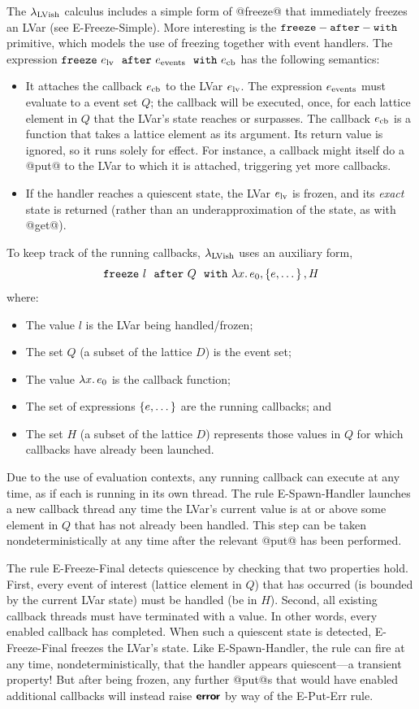 \documentclass{article}
\begin{document}
The $\lambda_{\textrm{LVish}}$ calculus includes a simple form of @freeze@ that
immediately freezes an LVar (see {\sc E-Freeze-Simple}).  More
interesting is the ${\mbox{\texttt{freeze}}-\mbox{\texttt{after}}-\mbox{\texttt{with}}}$ primitive, which models the use of freezing
together with event handlers.  The expression $\mbox{\texttt{freeze}}~e_{\rm
    lv}~~{\mbox{\texttt{after}}}~e_{\rm events}~~{\mbox{\texttt{with}}}~e_{\rm cb}$ has the following semantics:
\begin{itemize}
\item It attaches the callback $e_{\rm cb}$ to the LVar $e_{\rm lv}$.
  The expression $e_{\rm events}$ must evaluate to a event set $Q$;
  the callback will be executed, once, for each lattice element in $Q$
  that the LVar's state reaches or surpasses.  The callback $e_{\rm
    cb}$ is a function that takes a lattice element as its argument.
  Its return value is ignored, so it runs solely for effect.  For
  instance, a callback might itself do a @put@ to the LVar to which it
  is attached, triggering yet more callbacks.
\item If the handler reaches a quiescent state, the LVar $e_{\rm lv}$
  is frozen, and its \emph{exact} state is returned (rather than an
  underapproximation of the state, as with @get@).
\end{itemize}
\noindent
To keep track of the running callbacks, $\lambda_{\textrm{LVish}}$ uses an
auxiliary form,
\[
   \mbox{\texttt{freeze}}~l~~{\mbox{\texttt{after}}}~Q~~{\mbox{\texttt{with}}}~\lambda x.\,e_0, \left\{e, \dots\right\}, H
\]
where:
\begin{itemize}
\item The value $l$ is the LVar being handled/frozen;
\item The set $Q$ (a subset of the lattice $D$) is the event set;
\item The value $\lambda x.\,e_0$ is the callback function;
\item The set of expressions $\left\{e, \dots\right\}$ are the running
  callbacks; and
\item The set $H$ (a subset of the lattice $D$) represents those
  values in $Q$ for which callbacks have already been launched.
\end{itemize}
Due to the use of evaluation contexts, any running callback can
execute at any time, as if each is running in its own thread.  The
rule {\sc E-Spawn-Handler} launches a new callback thread any time the
LVar's current value is at or above some element in $Q$ that has not
already been handled.  This step can be taken nondeterministically at
any time after the relevant @put@ has been performed.

The rule {\sc E-Freeze-Final} detects quiescence by checking that two
properties hold.  First, every event of interest (lattice element in
$Q$) that has occurred (is bounded by the current LVar state) must be
handled (be in $H$).  Second, all existing callback threads must have
terminated with a value.  In other words, every enabled callback has
completed.  When such a quiescent state is detected, {\sc
  E-Freeze-Final} freezes the LVar's state.  Like {\sc
  E-Spawn-Handler}, the rule can fire at any time,
nondeterministically, that the handler appears quiescent---a transient
property!  But after being frozen, any further @put@s that would have
enabled additional callbacks will instead raise $\textbf{\textsf{error}}$ by way of the
{\sc E-Put-Err} rule.
\end{document}
